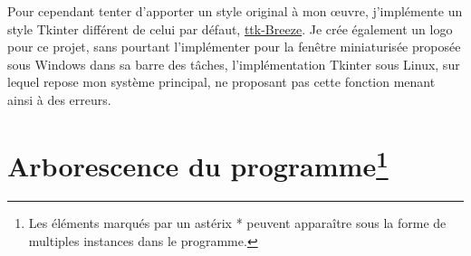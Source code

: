 \documentclass[a4]{article}
\begin{document}
Pour cependant tenter d'apporter un style original à mon \oe{}uvre, j'implémente un style Tkinter différent de celui par défaut, \href{https://github.com/MaxPerl/ttk-Breeze/tree/5872ff9bcec6aa7bcb9bd731422383a5d95f660d}{ttk-Breeze}. Je crée également un logo pour ce projet, sans pourtant l'implémenter pour la fenêtre miniaturisée proposée sous Windows dans sa barre des tâches, l'implémentation Tkinter sous Linux, sur lequel repose mon système principal, ne proposant pas cette fonction menant ainsi à des erreurs.

\section{Arborescence du programme\footnote{Les éléments marqués par un astérix * peuvent apparaître sous la forme de multiples instances dans le programme.}}

\end{document}

